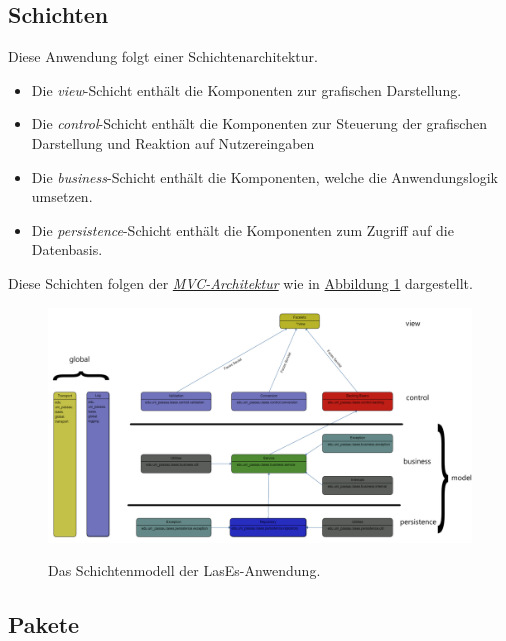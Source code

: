 
\subsection{Schichten}\label{arch:schichten}
Diese Anwendung folgt einer Schichtenarchitektur.
\begin{itemize}
    \item Die \emph{view}-Schicht enthält die Komponenten zur grafischen Darstellung.
    \item Die \emph{control}-Schicht enthält die Komponenten zur Steuerung der grafischen Darstellung und Reaktion auf
    Nutzereingaben
    \item Die \emph{business}-Schicht enthält die Komponenten, welche die Anwendungslogik umsetzen.
    \item Die \emph{persistence}-Schicht enthält die Komponenten zum Zugriff auf die Datenbasis.
\end{itemize}
Diese Schichten folgen der \emph{\hyperref[arch:mvc]{MVC-Architektur}} wie in \hyperref[arch:pakdia]{Abbildung 1} dargestellt.
\begin{figure}[h]
    \includegraphics[width=0.85\linewidth]{graphics/Paketdiagramm3.0}\label{arch:pakdia}
    \caption{Das Schichtenmodell der LasEs-Anwendung.}
\end{figure}


\subsection{Pakete}\label{arch:pakete}

